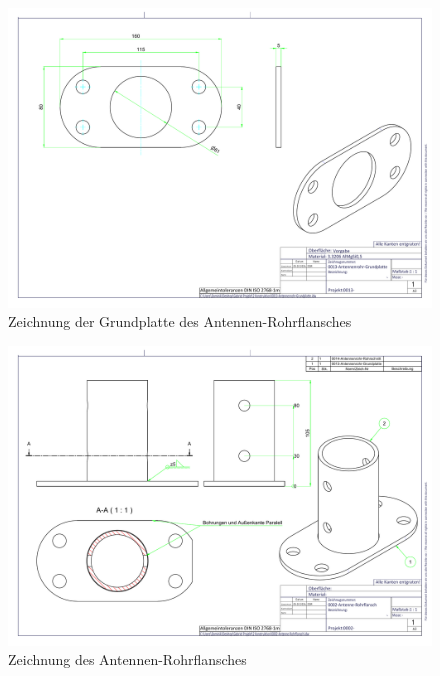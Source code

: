 \begin{landscape}
	\begin{figure}[h!]
	\includegraphics[angle=90,width=\textwidth]{../ref/0013-Antennenrohr-Grundplatte.pdf}
	\caption{Zeichnung der Grundplatte des Antennen-Rohrflansches}
	\label{fig:Grundplattelatte-Rohrflansch-Antenne}
\end{figure}
\end{landscape}

\begin{figure}[h!]
	\includegraphics[angle=90,width=\textwidth]{../ref/0002-Antenne-Rohrflansch.pdf}
	\caption{Zeichnung des Antennen-Rohrflansches}
	\label{fig:Rohrflansch-Antenne}
\end{figure}

